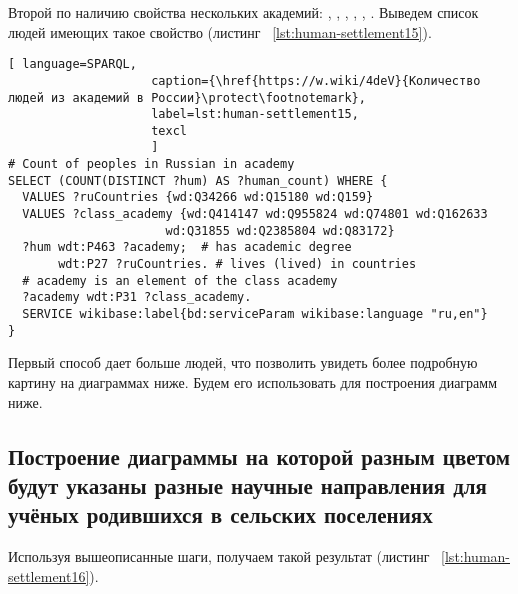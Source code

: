 Второй по наличию свойства  нескольких академий: , , , , , . Выведем список людей имеющих такое свойство (листинг ~\protect\ref{lst:human-settlement15}). 

\begin{lstlisting}[ language=SPARQL, 
                    caption={\href{https://w.wiki/4deV}{Количество людей из академий в России}\protect\footnotemark},
                    label=lst:human-settlement15,
                    texcl 
                    ]
# Count of peoples in Russian in academy
SELECT (COUNT(DISTINCT ?hum) AS ?human_count) WHERE {
  VALUES ?ruCountries {wd:Q34266 wd:Q15180 wd:Q159}
  VALUES ?class_academy {wd:Q414147 wd:Q955824 wd:Q74801 wd:Q162633 
                      wd:Q31855 wd:Q2385804 wd:Q83172}
  ?hum wdt:P463 ?academy;  # has academic degree 
       wdt:P27 ?ruCountries. # lives (lived) in countries
  # academy is an element of the class academy
  ?academy wdt:P31 ?class_academy. 
  SERVICE wikibase:label{bd:serviceParam wikibase:language "ru,en"}
}
\end{lstlisting}%

Первый способ дает больше людей, что позволить увидеть более подробную картину на диаграммах ниже. Будем его использовать для построения диаграмм ниже.

\subsection{Построение диаграммы на которой разным цветом будут указаны разные научные направления для учёных родившихся в сельских поселениях}

Используя вышеописанные шаги, получаем такой результат (листинг ~\protect\ref{lst:human-settlement16}).


